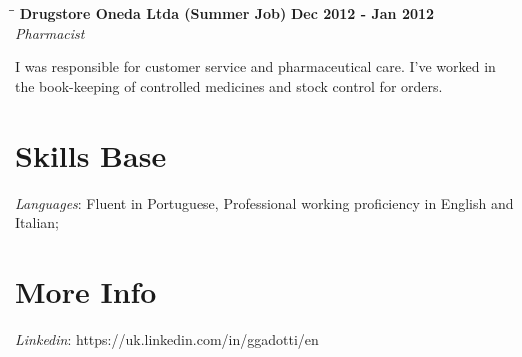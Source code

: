 \documentclass[margin]{res}
\begin{document}
\begin{resume}
\vspace{-0.1in}
   \begin{tabbing}
   \hspace{2.3in}\= \hspace{1.7in}\= \kill %
    \textbf{Drugstore Oneda Ltda (Summer Job)}    \>\>\textbf{Dec 2012 - Jan 2012}\\
    \textit{Pharmacist}\\   
   \end{tabbing}\vspace{-20pt}      %
I was responsible for customer service and pharmaceutical care. I’ve worked in the book-keeping of controlled
medicines and stock control for orders.

\section{Skills Base}

			\textit{Languages}: Fluent in Portuguese, Professional working proficiency in English and Italian;
 
\section{More Info}

      \textit{Linkedin}: https://uk.linkedin.com/in/ggadotti/en


\end{resume}
\center{\LaTeX}
\end{document}
